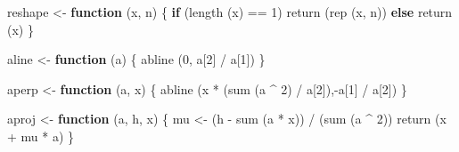 \documentclass[
  12pt,
]{book}
\newenvironment{Shaded}{\begin{snugshade}}{\end{snugshade}}
\newcommand{\ControlFlowTok}[1]{\textcolor[rgb]{0.13,0.29,0.53}{\textbf{#1}}}
\newcommand{\DecValTok}[1]{\textcolor[rgb]{0.00,0.00,0.81}{#1}}
\newcommand{\FunctionTok}[1]{\textcolor[rgb]{0.00,0.00,0.00}{#1}}
\newcommand{\NormalTok}[1]{#1}
\newcommand{\OtherTok}[1]{\textcolor[rgb]{0.56,0.35,0.01}{#1}}
\newcommand{\SpecialCharTok}[1]{\textcolor[rgb]{0.00,0.00,0.00}{#1}}
\begin{document}
\begin{Shaded}
\begin{Highlighting}[]
\NormalTok{reshape }\OtherTok{\textless{}{-}} \ControlFlowTok{function}\NormalTok{ (x, n) \{}
  \ControlFlowTok{if}\NormalTok{ (}\FunctionTok{length}\NormalTok{ (x) }\SpecialCharTok{==} \DecValTok{1}\NormalTok{)}
    \FunctionTok{return}\NormalTok{ (}\FunctionTok{rep}\NormalTok{ (x, n))}
  \ControlFlowTok{else}
    \FunctionTok{return}\NormalTok{ (x)}
\NormalTok{\}}

\NormalTok{aline }\OtherTok{\textless{}{-}} \ControlFlowTok{function}\NormalTok{ (a) \{}
  \FunctionTok{abline}\NormalTok{ (}\DecValTok{0}\NormalTok{, a[}\DecValTok{2}\NormalTok{] }\SpecialCharTok{/}\NormalTok{ a[}\DecValTok{1}\NormalTok{])}
\NormalTok{\}}

\NormalTok{aperp }\OtherTok{\textless{}{-}} \ControlFlowTok{function}\NormalTok{ (a, x) \{}
  \FunctionTok{abline}\NormalTok{ (x }\SpecialCharTok{*}\NormalTok{ (}\FunctionTok{sum}\NormalTok{ (a }\SpecialCharTok{\^{}} \DecValTok{2}\NormalTok{) }\SpecialCharTok{/}\NormalTok{ a[}\DecValTok{2}\NormalTok{]),}\SpecialCharTok{{-}}\NormalTok{a[}\DecValTok{1}\NormalTok{] }\SpecialCharTok{/}\NormalTok{ a[}\DecValTok{2}\NormalTok{])}
\NormalTok{\}}

\NormalTok{aproj }\OtherTok{\textless{}{-}} \ControlFlowTok{function}\NormalTok{ (a, h, x) \{}
\NormalTok{  mu }\OtherTok{\textless{}{-}}\NormalTok{ (h }\SpecialCharTok{{-}} \FunctionTok{sum}\NormalTok{ (a }\SpecialCharTok{*}\NormalTok{ x)) }\SpecialCharTok{/}\NormalTok{ (}\FunctionTok{sum}\NormalTok{ (a }\SpecialCharTok{\^{}} \DecValTok{2}\NormalTok{))}
  \FunctionTok{return}\NormalTok{ (x }\SpecialCharTok{+}\NormalTok{ mu }\SpecialCharTok{*}\NormalTok{ a)}
\NormalTok{\}}


\end{Highlighting}
\end{Shaded}
\end{document}
